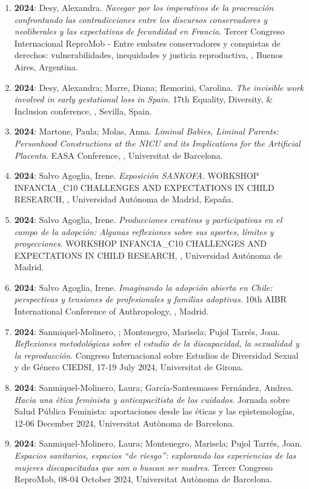 \begin{enumerate}
\item {\bf 2024}: Desy, Alexandra. {\it Navegar por los imperativos de la procreación confrontando las contradicciones entre los discursos conservadores y neoliberales y las expectativas de fecundidad en Francia}. Tercer Congreso Internacional ReproMob - Entre embates conservadores y conquistas de derechos: vulnerabilidades, inequidades y justicia reproductiva, , Buenos Aires, Argentina.\filbreak
\item {\bf 2024}: Desy, Alexandra; Marre, Diana; Remorini, Carolina. {\it The invisible work involved in early gestational loss in Spain}. 17th Equality, Diversity, \& Inclusion conference, , Sevilla, Spain.\filbreak
\item {\bf 2024}: Martone, Paula; Molas, Anna. {\it Liminal Babies, Liminal Parents: Personhood Constructions at the NICU and its Implications for the Artificial Placenta}. EASA Conference, , Universitat de Barcelona.\filbreak
\item {\bf 2024}: Salvo Agoglia, Irene. {\it Exposición SANKOFA}. WORKSHOP INFANCIA\_C10  CHALLENGES AND EXPECTATIONS IN CHILD RESEARCH, , Universidad Autónoma de Madrid, España.\filbreak
\item {\bf 2024}: Salvo Agoglia, Irene. {\it Producciones creativas y participativas en el campo de la adopción: Algunas reflexiones sobre sus aportes, límites y proyecciones}. WORKSHOP INFANCIA\_C10  CHALLENGES AND EXPECTATIONS IN CHILD RESEARCH, , Universidad Autónoma de Madrid.\filbreak
\item {\bf 2024}: Salvo Agoglia, Irene. {\it Imaginando la adopción abierta en Chile: perspectivas y tensiones de profesionales y familias adoptivas}. 10th AIBR International Conference of Anthropology, , Madrid.\filbreak
\item {\bf 2024}: Sanmiquel-Molinero, ; Montenegro, Marisela; Pujol Tarrés, Joan. {\it Reflexiones metodológicas sobre el estudio de la discapacidad, la sexualidad y la reproducción}. Congreso Internacional sobre Estudios de Diversidad Sexual y de Género CIEDSI, 17-19 July 2024, Universitat de Girona.\filbreak
\item {\bf 2024}: Sanmiquel-Molinero, Laura; García-Santesmases Fernández, Andrea. {\it Hacia una ética feminista y anticapacitista de los cuidados}. Jornada sobre Salud Pública Feminista: aportaciones desde las éticas y las epistemologías, 12-06 December 2024, Universitat Autònoma de Barcelona.\filbreak
\item {\bf 2024}: Sanmiquel-Molinero, Laura; Montenegro, Marisela; Pujol Tarrés, Joan. {\it Espacios sanitarios, espacios “de riesgo”: explorando las experiencias de las mujeres discapacitadas que son o buscan ser madres}. Tercer Congreso ReproMob, 08-04 October 2024, Universitat Autònoma de Barcelona.\filbreak

\end{enumerate}
